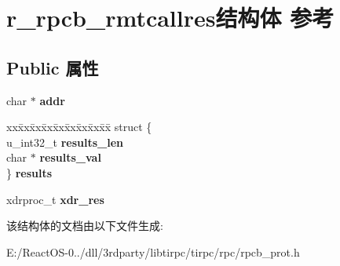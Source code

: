 \hypertarget{structr__rpcb__rmtcallres}{}\section{r\+\_\+rpcb\+\_\+rmtcallres结构体 参考}
\label{structr__rpcb__rmtcallres}
\subsection*{Public 属性}
\begin{DoxyCompactItemize}
\item 
\mbox{\label{structr__rpcb__rmtcallres_ac8bbfbfe4df3029583e0b9d0b7591a19}} 
char $\ast$ {\bfseries addr}
\item 
\mbox{\label{structr__rpcb__rmtcallres_a5b5ceb8f91fe0a1c728ac74f9ed54011}} 
\begin{tabbing}
xx\=xx\=xx\=xx\=xx\=xx\=xx\=xx\=xx\=\kill
struct \{\\
\>u\_int32\_t {\bfseries results\_len}\\
\>char $\ast$ {\bfseries results\_val}\\
\} {\bfseries results}\\

\end{tabbing}\item 
\mbox{\label{structr__rpcb__rmtcallres_a41015eca5f555df6fb12235e1616dca0}} 
xdrproc\+\_\+t {\bfseries xdr\+\_\+res}
\end{DoxyCompactItemize}


该结构体的文档由以下文件生成\+:\begin{DoxyCompactItemize}
\item 
E\+:/\+React\+O\+S-\/0../dll/3rdparty/libtirpc/tirpc/rpc/rpcb\+\_\+prot.\+h\end{DoxyCompactItemize}
